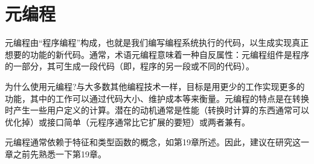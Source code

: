\chapter{元编程}
元编程由“程序编程”构成，也就是我们编写编程系统执行的代码，以生成实现真正想要的功能的新代码。通常，术语元编程意味着一种自反属性：元编程组件是程序的一部分，其可生成一段代码（即，程序的另一段或不同的代码）。

为什么使用元编程?与大多数其他编程技术一样，目标是用更少的工作实现更多的功能，其中的工作可以通过代码大小、维护成本等来衡量。元编程的特点是在转换时产生一些用户定义的计算。潜在的动机通常是性能（转换时计算的东西通常可以优化掉）或接口简单（元程序通常比它扩展的要短）或两者兼有。

元编程通常依赖于特征和类型函数的概念，如第19章所述。因此，建议在研究这一章之前先熟悉一下第19章。






